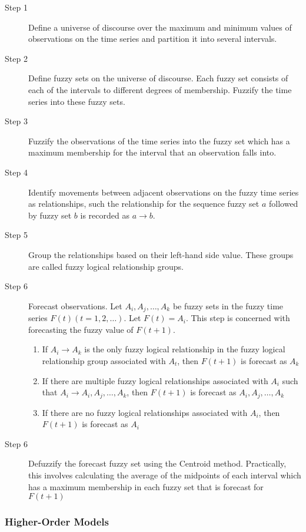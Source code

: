 \documentclass[12pt, oneside, a4paper]{article}
\theoremstyle{definition}
\begin{document}
\begin{description}
\item[Step 1] Define a universe of discourse over the maximum and minimum values of observations on the time series and partition it into several intervals.
\item[Step 2] Define fuzzy sets on the universe of discourse. Each fuzzy set consists of each of the intervals to different degrees of membership. Fuzzify the time series into these fuzzy sets.
\item[Step 3] Fuzzify the observations of the time series into the fuzzy set which has a maximum membership for the interval that an observation falls into.
\item[Step 4] Identify movements between adjacent observations on the fuzzy time series as relationships, such the relationship for the sequence fuzzy set $a$ followed by fuzzy set $b$ is recorded as $a \rightarrow b$.
\item[Step 5] Group the relationships based on their left-hand side value. These groups are called fuzzy logical relationship groups.
\item[Step 6] Forecast observations. Let $A_{i}, A_{j}, \ldots, A_{k}$ be fuzzy sets in the fuzzy time series $F(t)(t=1,2,\ldots)$. Let $F(t) = A_{i}$. This step is concerned with forecasting the fuzzy value of $F(t+1)$.
\begin{enumerate}
\item If  $A_i \rightarrow A_k$ is the only fuzzy logical relationship in the fuzzy logical relationship group associated with $A_t$, then $F(t+1)$ is forecast as $A_k$ 
\item If there are multiple fuzzy logical relationships associated with $A_i$ such that $A_i \rightarrow A_{i}, A_{j}, \ldots, A_{k}$, then $F(t+1)$ is forecast as $A_{i}, A_{j}, \ldots, A_{k}$
\item If there are no fuzzy logical relationships associated with $A_i$, then $F(t+1)$ is forecast as $A_i$
\end{enumerate}
\item[Step 6] Defuzzify the forecast fuzzy set using the Centroid method. Practically, this involves calculating the average of the midpoints of each interval which has a maximum membership in each fuzzy set that is forecast for $F(t+1)$
\end{description}

\subsubsection{Higher-Order Models}
\end{document}
